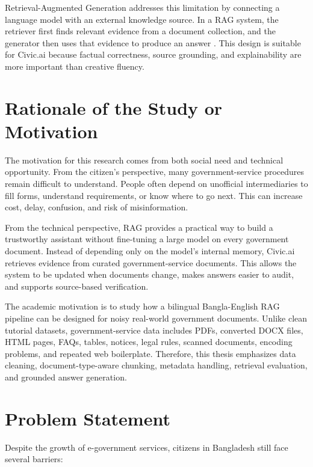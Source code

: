 Retrieval-Augmented Generation addresses this limitation by connecting a language model with an external knowledge source. In a RAG system, the retriever first finds relevant evidence from a document collection, and the generator then uses that evidence to produce an answer \cite{lewis2020rag}. This design is suitable for Civic.ai because factual correctness, source grounding, and explainability are more important than creative fluency.

\section{Rationale of the Study or Motivation}
The motivation for this research comes from both social need and technical opportunity. From the citizen's perspective, many government-service procedures remain difficult to understand. People often depend on unofficial intermediaries to fill forms, understand requirements, or know where to go next. This can increase cost, delay, confusion, and risk of misinformation.

From the technical perspective, RAG provides a practical way to build a trustworthy assistant without fine-tuning a large model on every government document. Instead of depending only on the model's internal memory, Civic.ai retrieves evidence from curated government-service documents. This allows the system to be updated when documents change, makes answers easier to audit, and supports source-based verification.

The academic motivation is to study how a bilingual Bangla-English RAG pipeline can be designed for noisy real-world government documents. Unlike clean tutorial datasets, government-service data includes PDFs, converted DOCX files, HTML pages, FAQs, tables, notices, legal rules, scanned documents, encoding problems, and repeated web boilerplate. Therefore, this thesis emphasizes data cleaning, document-type-aware chunking, metadata handling, retrieval evaluation, and grounded answer generation.

\section{Problem Statement}
Despite the growth of e-government services, citizens in Bangladesh still face several barriers:

